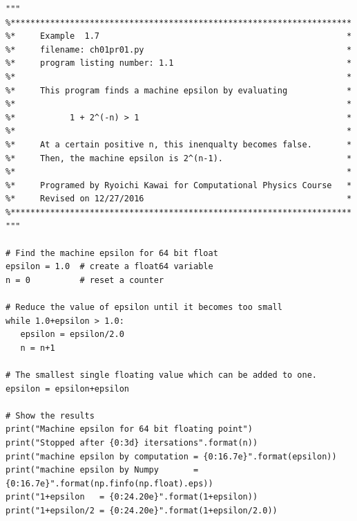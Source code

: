\footnotesize
\begin{verbatim}
"""
%*********************************************************************
%*     Example  1.7                                                  *
%*     filename: ch01pr01.py                                         *
%*     program listing number: 1.1                                   *
%*                                                                   *
%*     This program finds a machine epsilon by evaluating            *
%*                                                                   *
%*           1 + 2^(-n) > 1                                          *
%*                                                                   *
%*     At a certain positive n, this inenqualty becomes false.       *
%*     Then, the machine epsilon is 2^(n-1).                         *
%*                                                                   *
%*     Programed by Ryoichi Kawai for Computational Physics Course   *
%*     Revised on 12/27/2016                                         *
%*********************************************************************
"""

# Find the machine epsilon for 64 bit float
epsilon = 1.0  # create a float64 variable
n = 0          # reset a counter

# Reduce the value of epsilon until it becomes too small
while 1.0+epsilon > 1.0:
   epsilon = epsilon/2.0
   n = n+1

# The smallest single floating value which can be added to one.
epsilon = epsilon+epsilon

# Show the results
print("Machine epsilon for 64 bit floating point")
print("Stopped after {0:3d} itersations".format(n))
print("machine epsilon by computation = {0:16.7e}".format(epsilon))
print("machine epsilon by Numpy       = {0:16.7e}".format(np.finfo(np.float).eps))
print("1+epsilon   = {0:24.20e}".format(1+epsilon))
print("1+epsilon/2 = {0:24.20e}".format(1+epsilon/2.0))
\end{verbatim}

\normalsize
\vfill






